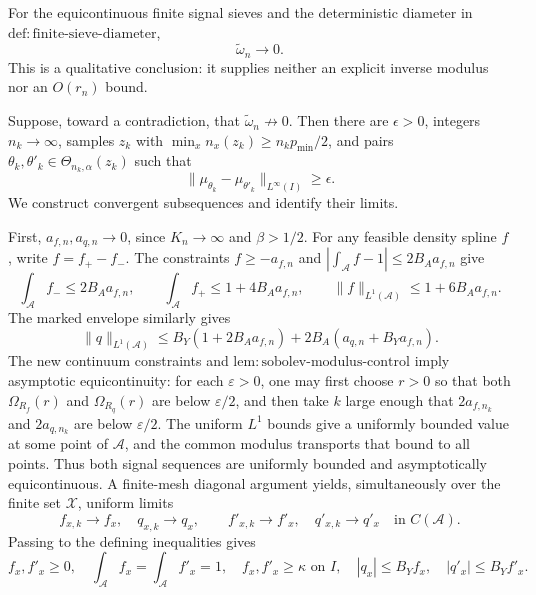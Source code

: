 For the equicontinuous finite signal sieves and the deterministic diameter in \(\mathrm{def{:}finite\text{-}sieve\text{-}diameter}\),
\[
 \widetilde\omega_n\longrightarrow0.
\]
This is a qualitative conclusion: it supplies neither an explicit inverse modulus nor an \(O(r_n)\) bound.

Suppose, toward a contradiction, that \(\widetilde\omega_n\not\to0\). Then there are \(\epsilon>0\), integers \(n_k\to\infty\), samples \(z_k\) with \(\min_xn_x(z_k)\ge n_kp_{\min}/2\), and pairs
\(\theta_k,\theta'_k\in\Theta_{n_k,\alpha}(z_k)\) such that
\[
 \|\mu_{\theta_k}-\mu_{\theta'_k}\|_{L^\infty(I)}\ge\epsilon.
\]
We construct convergent subsequences and identify their limits.

First, \(a_{f,n},a_{q,n}\to0\), since \(K_n\to\infty\) and \(\beta>1/2\). For any feasible density spline \(f\), write \(f=f_+-f_-\). The constraints \(f\ge-a_{f,n}\) and \(|\int_{\mathcal A}f-1|\le2B_Aa_{f,n}\) give
\[
 \int_{\mathcal A}f_-\le2B_Aa_{f,n},
 \qquad
 \int_{\mathcal A}f_+\le1+4B_Aa_{f,n},
 \qquad
 \|f\|_{L^1(\mathcal A)}\le1+6B_Aa_{f,n}.
\]
The marked envelope similarly gives
\[
 \|q\|_{L^1(\mathcal A)}
 \le B_Y(1+2B_Aa_{f,n})+2B_A(a_{q,n}+B_Ya_{f,n}).
\]
The new continuum constraints and \(\mathrm{lem{:}sobolev\text{-}modulus\text{-}control}\) imply asymptotic equicontinuity: for each \(\varepsilon>0\), one may first choose \(r>0\) so that both \(\Omega_{R_f}(r)\) and \(\Omega_{R_q}(r)\) are below \(\varepsilon/2\), and then take \(k\) large enough that \(2a_{f,n_k}\) and \(2a_{q,n_k}\) are below \(\varepsilon/2\). The uniform \(L^1\) bounds give a uniformly bounded value at some point of \(\mathcal A\), and the common modulus transports that bound to all points. Thus both signal sequences are uniformly bounded and asymptotically equicontinuous. A finite-mesh diagonal argument yields, simultaneously over the finite set \(\mathcal X\), uniform limits
\[
 f_{x,k}\to f_x,\quad q_{x,k}\to q_x,
 \qquad
 f'_{x,k}\to f'_x,\quad q'_{x,k}\to q'_x
 \quad\text{in }C(\mathcal A).
\]
Passing to the defining inequalities gives
\[
 f_x,f'_x\ge0,\quad \int_{\mathcal A}f_x=\int_{\mathcal A}f'_x=1,
 \quad f_x,f'_x\ge\kappa\text{ on }I,
 \quad |q_x|\le B_Yf_x,\quad |q'_x|\le B_Yf'_x.
\]

